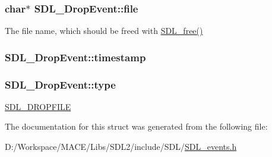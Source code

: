 \subsubsection[{\texorpdfstring{file}{file}}]{\setlength{\rightskip}{0pt plus 5cm}char$\ast$ S\+D\+L\+\_\+\+Drop\+Event\+::file}\hypertarget{struct_s_d_l___drop_event_abc41ef4beb62e1d8b56827128b29585f}{}\label{struct_s_d_l___drop_event_abc41ef4beb62e1d8b56827128b29585f}
The file name, which should be freed with \hyperlink{_s_d_l__stdinc_8h_a0e4ade894d550ada1fa19dc2d46e88b8}{S\+D\+L\+\_\+free()} 
\subsubsection[{\texorpdfstring{timestamp}{timestamp}}]{ S\+D\+L\+\_\+\+Drop\+Event\+::timestamp}\hypertarget{struct_s_d_l___drop_event_a02d2c81bb22db632a40cd0021ff751ab}{}\label{struct_s_d_l___drop_event_a02d2c81bb22db632a40cd0021ff751ab}
\subsubsection[{\texorpdfstring{type}{type}}]{ S\+D\+L\+\_\+\+Drop\+Event\+::type}\hypertarget{struct_s_d_l___drop_event_a5ea27cfaa5f8d4940e9a69b68b3cc035}{}\label{struct_s_d_l___drop_event_a5ea27cfaa5f8d4940e9a69b68b3cc035}
\hyperlink{_s_d_l__events_8h_a3b589e89be6b35c02e0dd34a55f3fccaad9238862d7aeaebff88be6453ee0fbab}{S\+D\+L\+\_\+\+D\+R\+O\+P\+F\+I\+LE} 

The documentation for this struct was generated from the following file\+:\begin{DoxyCompactItemize}
\item 
D\+:/\+Workspace/\+M\+A\+C\+E/\+Libs/\+S\+D\+L2/include/\+S\+D\+L/\hyperlink{_s_d_l__events_8h}{S\+D\+L\+\_\+events.\+h}\end{DoxyCompactItemize}
